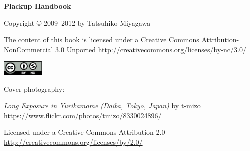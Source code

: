 \thispagestyle{empty}
\small
\null
\vfill
\begin{center}
  \textbf{Plackup Handbook}

  \bigskip
  
  Copyright \copyright{} 2009--2012 by Tatsuhiko Miyagawa

  \bigskip

  The content of this book is licensed under a Creative Commons Attribution-NonCommercial 3.0 Unported 
  \url{http://creativecommons.org/licenses/by-nc/3.0/}

  \medskip

  \includegraphics[width=2cm]{images/cc-by-nc}

  \bigskip

  Cover photography:
  
  \textit{Long Exposure in Yurikamome (Daiba, Tokyo, Japan)} by t-mizo
  \url{https://www.flickr.com/photos/tmizo/8330024896/}
 
  Licensed under a Creative Commons Attribution 2.0
  \url{http://creativecommons.org/licenses/by/2.0/}

 
\end{center}



